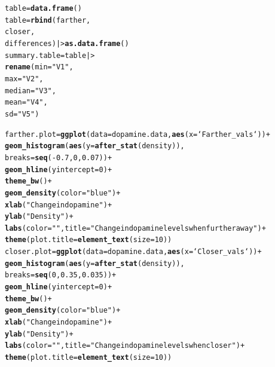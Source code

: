 \documentclass{article}\usepackage[]{graphicx}\usepackage[]{xcolor}
\makeatletter
\newcommand{\hlnum}[1]{\textcolor[rgb]{0.686,0.059,0.569}{#1}}%
\newcommand{\hlsng}[1]{\textcolor[rgb]{0.192,0.494,0.8}{#1}}%
\newcommand{\hlopt}[1]{\textcolor[rgb]{0,0,0}{#1}}%
\newcommand{\hldef}[1]{\textcolor[rgb]{0.345,0.345,0.345}{#1}}%
\newcommand{\hlkwb}[1]{\textcolor[rgb]{0.69,0.353,0.396}{#1}}%
\newcommand{\hlkwc}[1]{\textcolor[rgb]{0.333,0.667,0.333}{#1}}%
\newcommand{\hlkwd}[1]{\textcolor[rgb]{0.737,0.353,0.396}{\textbf{#1}}}%
\newenvironment{kframe}{%
 \def\at@end@of@kframe{}%
 \ifinner\ifhmode%
  \def\at@end@of@kframe{\end{minipage}}%
  \begin{minipage}{\columnwidth}%
 \fi\fi%
 \def\FrameCommand##1{\hskip\@totalleftmargin \hskip-\fboxsep
 \colorbox{shadecolor}{##1}\hskip-\fboxsep
     \hskip-\linewidth \hskip-\@totalleftmargin \hskip\columnwidth}%
 \MakeFramed {\advance\hsize-\width
   \@totalleftmargin\z@ \linewidth\hsize
   \@setminipage}}%
 {\par\unskip\endMakeFramed%
 \at@end@of@kframe}
\newenvironment{knitrout}{}{} %
\makeatother
\begin{document}
\begin{enumerate}
\begin{enumerate}
\begin{knitrout}
\begin{kframe}
\begin{alltt}
\hldef{table} \hlkwb{=} \hlkwd{data.frame}\hldef{()}
\hldef{table} \hlkwb{=} \hlkwd{rbind}\hldef{(farther,}
              \hldef{closer,}
              \hldef{differences) |>} \hlkwd{as.data.frame}\hldef{()}
\hldef{summary.table} \hlkwb{=} \hldef{table |>}
  \hlkwd{rename}\hldef{(}\hlkwc{min} \hldef{=} \hlsng{"V1"}\hldef{,}
         \hlkwc{max} \hldef{=} \hlsng{"V2"}\hldef{,}
         \hlkwc{median} \hldef{=} \hlsng{"V3"}\hldef{,}
         \hlkwc{mean} \hldef{=} \hlsng{"V4"}\hldef{,}
         \hlkwc{sd} \hldef{=} \hlsng{"V5"}\hldef{)}

\hldef{farther.plot} \hlkwb{=} \hlkwd{ggplot}\hldef{(}\hlkwc{data} \hldef{= dopamine.data,} \hlkwd{aes}\hldef{(}\hlkwc{x}\hldef{=`Farther_vals`))}\hlopt{+}
  \hlkwd{geom_histogram}\hldef{(}\hlkwd{aes}\hldef{(}\hlkwc{y}\hldef{=}\hlkwd{after_stat}\hldef{(density)),}
                 \hlkwc{breaks}\hldef{=}\hlkwd{seq}\hldef{(}\hlopt{-}\hlnum{0.7}\hldef{,}\hlnum{0}\hldef{,}\hlnum{0.07}\hldef{))} \hlopt{+}
  \hlkwd{geom_hline}\hldef{(}\hlkwc{yintercept}\hldef{=}\hlnum{0}\hldef{)}\hlopt{+}
  \hlkwd{theme_bw}\hldef{()}\hlopt{+}
  \hlkwd{geom_density}\hldef{(}\hlkwc{color} \hldef{=} \hlsng{"blue"}\hldef{)} \hlopt{+}
  \hlkwd{xlab}\hldef{(}\hlsng{"Change in dopamine"}\hldef{)}\hlopt{+}
  \hlkwd{ylab}\hldef{(}\hlsng{"Density"}\hldef{)}\hlopt{+}
  \hlkwd{labs}\hldef{(}\hlkwc{color} \hldef{=} \hlsng{""}\hldef{,} \hlkwc{title} \hldef{=} \hlsng{"Change in dopamine levels when further away"}\hldef{)} \hlopt{+}
  \hlkwd{theme}\hldef{(}\hlkwc{plot.title} \hldef{=} \hlkwd{element_text}\hldef{(}\hlkwc{size} \hldef{=} \hlnum{10}\hldef{))}
\hldef{closer.plot} \hlkwb{=} \hlkwd{ggplot}\hldef{(}\hlkwc{data} \hldef{= dopamine.data,} \hlkwd{aes}\hldef{(}\hlkwc{x}\hldef{=`Closer_vals`))}\hlopt{+}
  \hlkwd{geom_histogram}\hldef{(}\hlkwd{aes}\hldef{(}\hlkwc{y}\hldef{=}\hlkwd{after_stat}\hldef{(density)),}
                 \hlkwc{breaks}\hldef{=}\hlkwd{seq}\hldef{(}\hlnum{0}\hldef{,}\hlnum{0.35}\hldef{,}\hlnum{0.035}\hldef{))} \hlopt{+}
  \hlkwd{geom_hline}\hldef{(}\hlkwc{yintercept}\hldef{=}\hlnum{0}\hldef{)}\hlopt{+}
  \hlkwd{theme_bw}\hldef{()}\hlopt{+}
  \hlkwd{geom_density}\hldef{(}\hlkwc{color} \hldef{=} \hlsng{"blue"}\hldef{)} \hlopt{+}
  \hlkwd{xlab}\hldef{(}\hlsng{"Change in dopamine"}\hldef{)}\hlopt{+}
  \hlkwd{ylab}\hldef{(}\hlsng{"Density"}\hldef{)}\hlopt{+}
  \hlkwd{labs}\hldef{(}\hlkwc{color} \hldef{=} \hlsng{""}\hldef{,} \hlkwc{title} \hldef{=} \hlsng{"Change in dopamine levels when closer"}\hldef{)} \hlopt{+}
  \hlkwd{theme}\hldef{(}\hlkwc{plot.title} \hldef{=} \hlkwd{element_text}\hldef{(}\hlkwc{size} \hldef{=} \hlnum{10}\hldef{))}

\end{alltt}
\end{kframe}
\end{knitrout}
\end{enumerate}
\end{enumerate}
\end{document}
